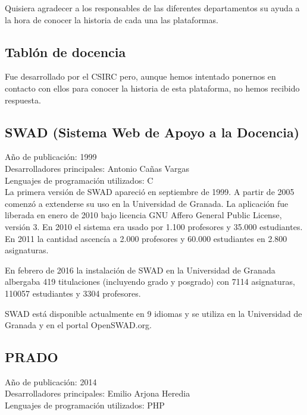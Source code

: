 Quisiera agradecer a los responsables de las diferentes departamentos su ayuda a la hora de conocer la historia de cada una las plataformas.

\subsection{Tablón de docencia}

Fue desarrollado por el CSIRC pero, aunque hemos intentado ponernos en contacto con ellos para conocer la historia de esta plataforma, no hemos recibido respuesta.

\subsection{SWAD (Sistema Web de Apoyo a la Docencia)}

Año de publicación: 1999\\

Desarrolladores principales: Antonio Cañas Vargas\\

Lenguajes de programación utilizados: C\\

\bigskip
La primera versión de SWAD apareció en septiembre de 1999. A partir de 2005 comenzó a extenderse su uso en la Universidad de Granada. La aplicación fue liberada en enero de 2010 bajo licencia GNU Affero General Public License, versión 3.
\bigskip
En 2010 el sistema era usado por 1.100 profesores y 35.000 estudiantes. En 2011 la cantidad ascencía a 2.000 profesores y 60.000 estudiantes en 2.800 asignaturas.

\bigskip
En febrero de 2016 la instalación de SWAD en la Universidad de Granada albergaba 419 titulaciones (incluyendo grado y posgrado) con 7114 asignaturas, 110057 estudiantes y 3304 profesores.

\bigskip
SWAD está disponible actualmente en 9 idiomas y se utiliza en la Universidad de Granada y en el portal OpenSWAD.org.

\subsection{PRADO}

Año de publicación: 2014\\

Desarrolladores principales: Emilio Arjona Heredia\\

Lenguajes de programación utilizados: PHP\\

